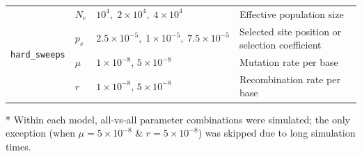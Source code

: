 \documentclass[9pt,twoside]{pnas-new} %
\providecommand{\DIFaddendFL}{} %
\begin{document}
\begin{table}[t]
{\begin{tabular}{llll}
        \multirow{4}{*}{\texttt{hard\_sweeps}}
            & $N_e$   & $10^4,\; 2\times10^4,\; 4\times10^4$  & Effective population size \\
            & $p_s$   & $2.5\times10^{-5},\; 1\times10^{-5},\; 7.5\times10^{-5}$ & Selected site position or selection coefficient \\
            & $\mu$   & $1\times10^{-8}$, $5\times10^{-8}$       & Mutation rate per base \\
            & $r$     & $1\times10^{-8}$, $5\times10^{-8}$       & Recombination rate per base \\
        \bottomrule
    \end{tabular}
    }
    \DIFaddendFL \vspace{1ex}

    {\footnotesize%
    * Within each model, all‐vs‐all parameter combinations were simulated; the only exception (when $\mu = 5\times10^{-8}$ \& $r = 5\times10^{-8}$) was skipped due to long simulation times.%
    }
\end{table}
\end{document}
